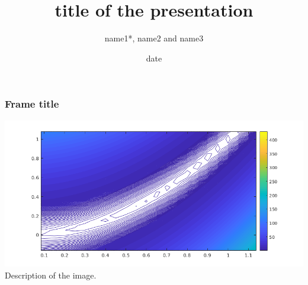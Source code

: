 \documentclass[aspectratio=169]{beamer}
\title{title of the presentation​​}
\author[name1, name2, name3]{name1*, name2 and name3}
\date[site]{date}
\begin{document}
\begin{frame}
 \titlepage 
\end{frame}

\begin{frame}
 \frametitle{Frame title} 
 \includegraphics[scale=0.6]{images/rosenbrockzoom.png} 
 Description of the image.
\end{frame}
\end{document}
